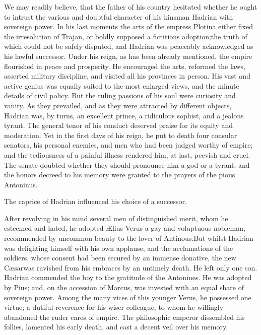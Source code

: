 

We may readily believe, that the father of his country hesitated
whether he ought to intrust the various and doubtful character of
his kinsman Hadrian with sovereign power. In his last moments the
arts of the empress Plotina either fixed the irresolution of
Trajan, or boldly supposed a fictitious adoption;\footnotemark[38] the truth of
which could not be safely disputed, and Hadrian was peaceably
acknowledged as his lawful successor. Under his reign, as has
been already mentioned, the empire flourished in peace and
prosperity. He encouraged the arts, reformed the laws, asserted
military discipline, and visited all his provinces in person. His
vast and active genius was equally suited to the most enlarged
views, and the minute details of civil policy. But the ruling
passions of his soul were curiosity and vanity. As they
prevailed, and as they were attracted by different objects,
Hadrian was, by turns, an excellent prince, a ridiculous sophist,
and a jealous tyrant. The general tenor of his conduct deserved
praise for its equity and moderation. Yet in the first days of
his reign, he put to death four consular senators, his personal
enemies, and men who had been judged worthy of empire; and the
tediousness of a painful illness rendered him, at last, peevish
and cruel. The senate doubted whether they should pronounce him a
god or a tyrant; and the honors decreed to his memory were
granted to the prayers of the pious Antoninus.\footnotemark[39]



The caprice of Hadrian influenced his choice of a successor.

After revolving in his mind several men of distinguished merit,
whom he esteemed and hated, he adopted Ælius Verus a gay and
voluptuous nobleman, recommended by uncommon beauty to the lover
of Antinous.\footnotemark[40] But whilst Hadrian was delighting himself with
his own applause, and the acclamations of the soldiers, whose
consent had been secured by an immense donative, the new Cæsar\footnotemark[41]
was ravished from his embraces by an untimely death. He left only
one son. Hadrian commended the boy to the gratitude of the
Antonines. He was adopted by Pius; and, on the accession of
Marcus, was invested with an equal share of sovereign power.
Among the many vices of this younger Verus, he possessed one
virtue; a dutiful reverence for his wiser colleague, to whom he
willingly abandoned the ruder cares of empire. The philosophic
emperor dissembled his follies, lamented his early death, and
cast a decent veil over his memory.

